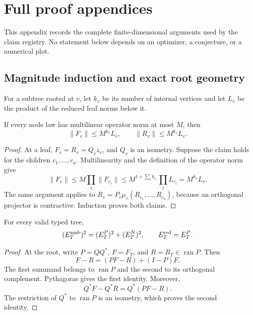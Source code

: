\section{Full proof appendices}
\label{app:proofs}

This appendix records the complete finite-dimensional arguments used by the
claim registry. No statement below depends on an optimizer, a conjecture, or
a numerical plot.

\subsection{Magnitude induction and exact root geometry}

For a subtree rooted at \(v\), let \(k_v\) be its number of internal
vertices and let \(L_v\) be the product of the reduced leaf norms below it.

\begin{lemma}
\label{lem:magnitudes}
If every node law has multilinear operator norm at most \(M\), then
\[
  \lVert F_v\rVert\le M^{k_v}L_v,
  \qquad
  \lVert R_v\rVert\le M^{k_v}L_v.
\]
\end{lemma}

\begin{proof}
At a leaf, \(F_v=R_v=Q_vz_v\), and \(Q_v\) is an isometry. Suppose the
claim holds for the children \(c_1,\ldots,c_a\). Multilinearity and the
definition of the operator norm give
\[
 \lVert F_v\rVert
 \le M\prod_i \lVert F_{c_i}\rVert
 \le M^{1+\sum_i k_{c_i}}\prod_iL_{c_i}
 =M^{k_v}L_v.
\]
The same argument applies to
\(R_v=P_v\mu_v(R_{c_1},\ldots,R_{c_a})\), because an orthogonal projector
is contractive. Induction proves both claims.
\end{proof}

\begin{proposition}
\label{prop:rootgeometry}
For every valid typed tree,
\[
 (E_T^{\rm amb})^2=(E_T^P)^2+(E_T^N)^2,
 \qquad E_T^{\rm red}=E_T^P.
\]
\end{proposition}

\begin{proof}
At the root, write \(P=QQ^*\), \(F=F_T\), and
\(R=R_T\in\operatorname{ran}P\). Then
\[
 F-R=(PF-R)+(I-P)F.
\]
The first summand belongs to \(\operatorname{ran}P\) and the second to its
orthogonal complement. Pythagoras gives the first identity. Moreover,
\[
 Q^*F-Q^*R=Q^*(PF-R).
\]
The restriction of \(Q^*\) to \(\operatorname{ran}P\) is an isometry,
which proves the second identity.
\end{proof}

